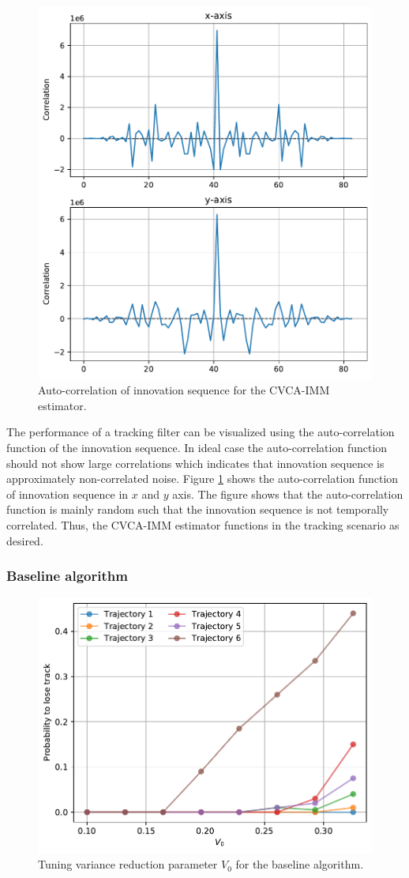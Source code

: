 \documentclass[english, 12pt, a4paper, elec, utf8, a-1b, online]{aaltothesis}
\begin{document}
\begin{figure}[bt]
    \centering
    \includegraphics[width=0.7\linewidth]{figures/benchmark/IMM/correlation_imm.pdf}
    \caption{Auto-correlation of innovation sequence for the CVCA-IMM estimator.}
    \label{fig:auto_correlation}
\end{figure}

The performance of a tracking filter can be visualized using the auto-correlation function of the innovation sequence.
In ideal case the auto-correlation function should not show large correlations which indicates that innovation sequence is approximately non-correlated noise.
Figure \ref{fig:auto_correlation} shows the auto-correlation function of innovation sequence in $x$ and $y$ axis.
The figure shows that the auto-correlation function is mainly random such that the innovation sequence is not temporally correlated.
Thus, the CVCA-IMM estimator functions in the tracking scenario as desired.



\subsubsection{Baseline algorithm}

\begin{figure}[tb]
    \centering
    \includegraphics[width=0.7\linewidth]{figures/benchmark/Simulations/plt_baseline.pdf}
    \caption{Tuning variance reduction parameter $V_0$ for the baseline algorithm.}
    \label{fig:baseline_plt}
\end{figure}
\end{document}
